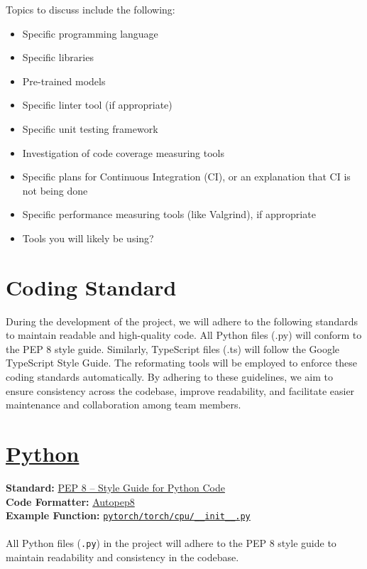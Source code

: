 \documentclass{article}
\begin{document}
Topics to discuss include the following:

\begin{itemize}
\item Specific programming language
\item Specific libraries
\item Pre-trained models
\item Specific linter tool (if appropriate)
\item Specific unit testing framework
\item Investigation of code coverage measuring tools
\item Specific plans for Continuous Integration (CI), or an explanation that CI
  is not being done
\item Specific performance measuring tools (like Valgrind), if
  appropriate
\item Tools you will likely be using?
\end{itemize}


\section{Coding Standard}
During the development of the project, we will adhere to the following standards to maintain readable and high-quality code. All Python files (.py) will conform to the PEP 8 style guide. Similarly, TypeScript files (.ts) will follow the Google TypeScript Style Guide. The reformating tools will be employed to enforce these coding standards automatically. By adhering to these guidelines, we aim to ensure consistency across the codebase, improve readability, and facilitate easier maintenance and collaboration among team members.

\newpage{}
\section*{\href{https://github.com/python/cpython}{Python}}

\textbf{Standard:} \href{https://peps.python.org/pep-0008/}{PEP 8 – Style Guide for Python Code} \\
\textbf{Code Formatter:} \href{https://github.com/hhatto/autopep8}{Autopep8} \\
\textbf{Example Function:} \texttt{\href{https://github.com/pytorch/pytorch/blob/main/torch/cpu/__init__.py}{pytorch/torch/cpu/\_\_init\_\_.py}} \\\\
All Python files (\texttt{.py}) in the project will adhere to the PEP 8 style guide to maintain readability and consistency in the codebase.
\end{document}
